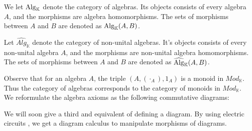 \documentclass[../thesis.tex]{subfiles}
\begin{document}
            \begin{definition}
                We let $\tt{Alg}_{\mathbb{K}}$ denote the category of algebras. Its objects consists of every algebra $A$, and the morphisms are algebra homomorphisms. The sets of morphisms between $A$ and $B$ are denoted as $\tt{Alg}_{\mathbb{K}}(A,B)$.
                
                Let $\widehat{Alg}_{\mathbb{K}}$ denote the category of non-unital algebras. It's objects consists of every non-unital algebra $A$, and the morphisms are non-unital algebra homomorphisms. The sets of morphisms between $A$ and $B$ are denoted as $\widehat{\tt{Alg}}_{\mathbb{K}}(A,B)$.
            \end{definition}

            Observe that for an algebra $A$, the triple $(A,(\cdot_A),1_A)$ is a monoid in $Mod_{\mathbb{K}}$. Thus the category of algebras corresponds to the category of monoids in $Mod_\mathbb{K}$. We reformulate the algebra axioms as the following commutative diagrams: 
            \begin{center}
                 \quad
            \end{center}

            We will soon give a third and equivalent of defining a diagram. By using electric circuits \cite{Loday12}, we get a diagram calculus to manipulate morphisms of diagrams.
                    
\end{document}
